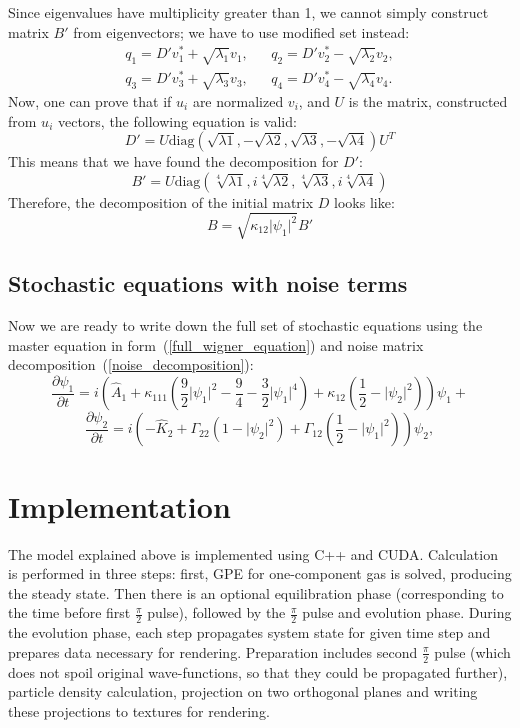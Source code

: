 \documentclass[12pt,notitlepage]{report}
\begin{document}
Since eigenvalues have multiplicity greater than 1, we cannot simply construct matrix $B'$ from eigenvectors;
we have to use modified set instead:
\begin{eqnarray*}
q_1 = D' v_1^* + \sqrt{\lambda_1} v_1, & &
q_2 = D' v_2^* - \sqrt{\lambda_2} v_2, \\
q_3 = D' v_3^* + \sqrt{\lambda_3} v_3, & &
q_4 = D' v_4^* - \sqrt{\lambda_4} v_4.
\end{eqnarray*}
Now, one can prove that if $u_i$ are normalized $v_i$, and $U$ is the matrix, constructed from $u_i$ vectors,
the following equation is valid:
\[ D' = U \textrm{diag} \left( \sqrt{\lambda{1}}, -\sqrt{\lambda{2}}, \sqrt{\lambda{3}}, -\sqrt{\lambda{4}} \right) U^T \]
This means that we have found the decomposition for $D'$:
\[ B' = U \textrm{diag} \left( \sqrt[4]{\lambda{1}}, i \sqrt[4]{\lambda{2}}, \sqrt[4]{\lambda{3}}, i \sqrt[4]{\lambda{4}} \right) \]
Therefore, the decomposition of the initial matrix $D$ looks like:
\begin{equation}
\label{noise_decomposition}
B = \sqrt{\kappa_{12} \lvert \psi_1 \rvert^2} B'
\end{equation}

\subsection*{Stochastic equations with noise terms}

Now we are ready to write down the full set of stochastic equations using the master equation in form~(\ref{full_wigner_equation})
and noise matrix decomposition~(\ref{noise_decomposition}):
\[
\frac{\partial \psi_1}{\partial t} = i \left( \hat{A}_1 +
\kappa_{111} \left( \frac{9}{2} \lvert \psi_1 \rvert^2 - \frac{9}{4} - \frac{3}{2} \lvert \psi_1 \rvert^4 \right) +
\kappa_{12} \left( \frac{1}{2} - \lvert \psi_2 \rvert^2 \right) \right) \psi_1 +
\]
\[
\frac{\partial \psi_2}{\partial t} = i \left( - \hat{K}_2 + \Gamma_{22} \left( 1 - \lvert \psi_2 \rvert^2 \right) +
\Gamma_{12} \left( \frac{1}{2} - \lvert \psi_1 \rvert^2 \right) \right) \psi_2,
\]

\section*{Implementation}

The model explained above is implemented using C++ and CUDA.
Calculation is performed in three steps: first, GPE for one-component gas is solved, producing the steady state.
Then there is an optional equilibration phase (corresponding to the time before first $\frac{\pi}{2}$ pulse),
followed by the $\frac{\pi}{2}$ pulse and evolution phase.
During the evolution phase, each step propagates system state for given time step and prepares data necessary for rendering.
Preparation includes second $\frac{\pi}{2}$ pulse
(which does not spoil original wave-functions, so that they could be propagated further),
particle density calculation, projection on two orthogonal planes and writing these projections to textures for rendering.
\end{document}
